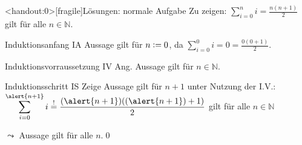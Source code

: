 {\begin{frame}<handout:0>[fragile]{Lösungen: normale Aufgabe}
    Zu zeigen: $\displaystyle\sum_{i=0}^{n} i = \frac{n(n+1)}{2}$ gilt für alle $n \in \mathbb{N}$.
    \begin{alertblock}{Induktionsanfang IA}
        Aussage gilt für $n\vcentcolon= 0$, da $\displaystyle\sum_{i=0}^{0} i = 0 = \frac{0(0+1)}{2}$.
    \end{alertblock}
    \begin{alertblock}{Induktionsvorraussetzung IV}
        Ang. Aussage gilt für $n \in\mathbb{N}$.
    \end{alertblock}
    \begin{alertblock}{Induktionsschritt IS}
        Zeige Aussage gilt für $n+1$ unter Nutzung der I.V.:\\
        $\displaystyle\sum_{i=0}^{\alert{n+1}} i \overset{!}{=} \frac{(\alert{n+1})((\alert{n+1})+1)}{2}$ gilt für alle $n \in \mathbb{N}$
    \end{alertblock}
    \alert{$\leadsto$ Aussage gilt für alle $n$.}\qed
\end{frame}
}


